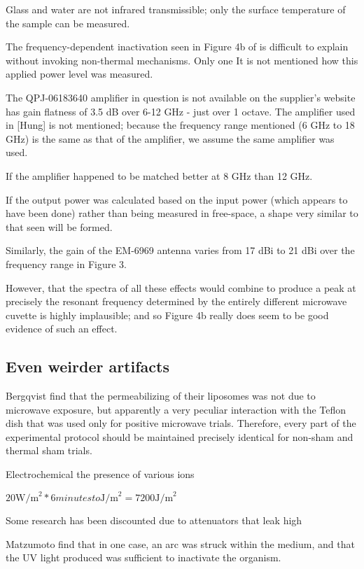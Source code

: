 \documentclass[paper.tex]{subfiles}
\begin{document}
\begin{multicols}{1}
Glass and water are not infrared transmissible; only the surface temperature of the sample can be measured. 

The frequency-dependent inactivation seen in Figure 4b of \cite{Efficient2015} is difficult to explain without invoking non-thermal mechanisms. Only one  It is not mentioned how this applied power level was measured. 

The QPJ-06183640 amplifier in question is not available on the supplier's website \cite{Microwaved} has gain flatness of 3.5 dB over 6-12 GHz - just over 1 octave. The amplifier used in [Hung] is not mentioned; because the frequency range mentioned (6 GHz to 18 GHz) is the same as that of the amplifier, we assume the same amplifier was used. 

If the amplifier happened to be matched better at 8 GHz than 12 GHz.

If the output power was calculated based on the input power (which appears to have been done) rather than being measured in free-space, a shape very similar to that seen will be formed.

Similarly, the gain of the EM-6969 antenna\cite{EM6969} varies from 17 dBi to 21 dBi over the frequency range in Figure 3.

However, that the spectra of all these effects would combine to produce a peak at precisely the resonant frequency determined by the entirely different microwave cuvette is highly implausible; and so Figure 4b really does seem to be good evidence of such an effect.


\subsection{Even weirder artifacts}

Bergqvist \cite{Effect1994a} find that the permeabilizing of their liposomes was not due to microwave exposure, but apparently a very peculiar interaction with the Teflon dish that was used only for positive microwave trials. Therefore, every part of the experimental protocol should be maintained precisely identical for non-sham and thermal sham trials.

Electrochemical the presence of various ions 



$20 \text{W/m}^2 * 6 minutes to \text{J/m}^2 = 7200 \text{J/m}^2$


Some research has been discounted due to attenuators that leak high 

Matzumoto \cite{Inactivation1991} find that in one case, an arc was struck within the medium, and that the UV light produced was sufficient to inactivate the organism.






\end{multicols}
\end{document}
